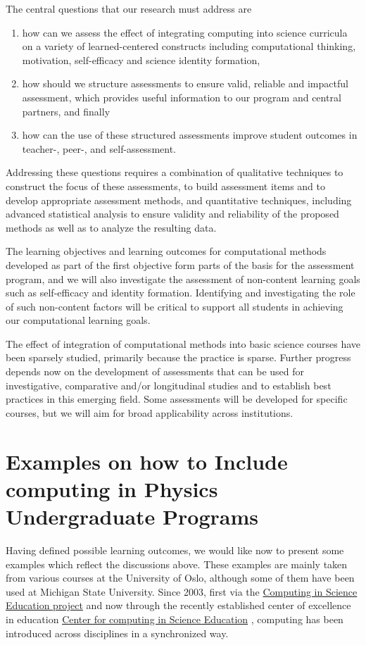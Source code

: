 \documentclass[graybox,envcountchap,sectrefs]{svmult}
\begin{document}
The central questions that our research must address are
\begin{enumerate}
\item how can we assess the effect of integrating computing  into science curricula on a variety of learned-centered constructs including computational thinking, motivation, self-efficacy and science identity formation,
\item how should we structure assessments to ensure valid, reliable and impactful assessment, which provides useful information to our program and central partners, and finally
\item how can the use of these structured assessments improve student outcomes in teacher-, peer-, and self-assessment.
\end{enumerate}


Addressing these questions requires a combination of qualitative
techniques to construct the focus of these assessments, to build
assessment items and to develop appropriate assessment methods, and
quantitative techniques, including advanced statistical analysis to
ensure validity and reliability of the proposed methods as well as to
analyze the resulting data.

The learning objectives and learning outcomes for computational
methods developed as part of the first objective form parts of the
basis for the assessment program, and we will also investigate the
assessment of non-content learning goals such as self-efficacy and
identity formation. Identifying and investigating the role of such non-content
factors will be critical to support all students in achieving our computational
learning goals.

The effect of integration of computational methods into basic science
courses have been sparsely studied, primarily because the practice is
sparse. Further progress depends now on the development of assessments
that can be used for investigative, comparative and/or longitudinal
studies and to establish best practices in this emerging field.  Some
assessments will be developed for specific courses, but we will aim
for broad applicability across institutions.

\section{Examples on how to Include computing in Physics Undergraduate Programs}\label{sec:examples}

Having defined possible learning outcomes, we would like now to
present some examples which reflect the discussions above. These
examples are mainly taken from various courses at the University of
Oslo, although some of them have been used at Michigan State University. Since 2003, first via the
\href{{http://www.mn.uio.no/ccse/english/people/index.html}}{Computing
  in Science Education project} \cite{CSEUiO} and now through the recently
established center of excellence in education
\href{{http://www.mn.uio.no/ccse/english/}}{Center for computing in
  Science Education} \cite{CCSEUiO}, computing has been introduced across
disciplines in a synchronized way.
\end{document}
